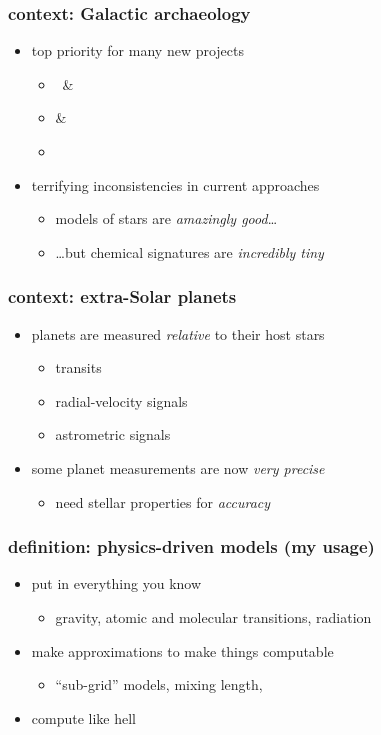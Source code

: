 \documentclass[pdftex]{beamer}
\begin{document}
\begin{frame}
  \frametitle{context: Galactic archaeology}
  \begin{itemize}
  \item top priority for many new projects
    \begin{itemize}
    \item \gaia\ \& 
    \item {} \& 
    \item \sdssiii\ \apogee
    \end{itemize}
  \item terrifying inconsistencies in current approaches
    \begin{itemize}
    \item models of stars are \emph{amazingly good}\ldots
    \item \ldots but chemical signatures are \emph{incredibly tiny}
    \end{itemize}
  \end{itemize}
\end{frame}

\begin{frame}
  \frametitle{context: extra-Solar planets}
  \begin{itemize}
  \item planets are measured \emph{relative} to their host stars
    \begin{itemize}
    \item transits
    \item radial-velocity signals
    \item astrometric signals
    \end{itemize}
  \item some planet measurements are now \emph{very precise}
    \begin{itemize}
    \item need stellar properties for \emph{accuracy}
    \end{itemize}
  \end{itemize}
\end{frame}

\begin{frame}
  \frametitle{definition: physics-driven models (my usage)}
  \begin{itemize}
  \item put in everything you know
    \begin{itemize}
    \item gravity, atomic and molecular transitions, radiation
    \end{itemize}
  \item make approximations to make things computable
    \begin{itemize}
    \item ``sub-grid'' models, mixing length, 
    \end{itemize}
  \item compute like hell
  \end{itemize}
\end{frame}
\end{document}
